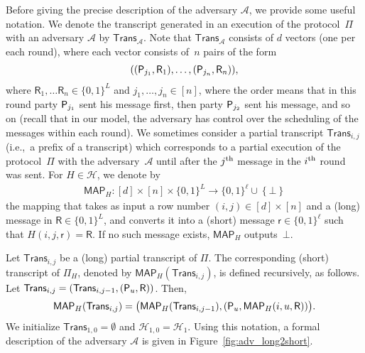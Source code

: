 \documentclass[11pt]{article}
\theoremstyle{plain}
\theoremstyle{definition}
\numberwithin{equation}{section}
\numberwithin{equation}{section} \newcommand{\aka} {also known as\ }
\newcommand{\ie}  {i.e.,\ }
\newcommand{\Hc}{\mathcal H}
\newcommand{\B}{\{ 0,1 \}}
\newcommand{\1}{\mathbf{1}}
\newcommand{\Adv}{\mathcal A}
\newcommand{\ith}[1]{{#1}\textsuperscript{th}}
\newcommand{\lo}{{\mathsf{R}}}
\newcommand{\sh}{{\mathsf{r}}}
\newcommand{\real}{\Adv}
\newcommand{\trans}{{\mathsf{Trans}}}
\newcommand{\MAP}{\mathsf{MAP}}
\theoremstyle{remark}
\begin{document}
Before giving the precise description of the adversary $\Adv$, we provide some
useful notation.  We denote the transcript generated in an execution of the
protocol~$\Pi$ with an adversary $\Adv$ by $\trans_{\real}$. Note that
$\trans_{\real}$ consists of $d$ vectors (one per each round), where each vector
consists of~$n$ pairs of the form
\begin{align*}
  ((\party{j_1},\lo_1),\ldots,(\party{j_{n}},\lo_n)),
\end{align*}
where $\lo_1,\ldots\lo_n\in\B^L$ and $j_1,\dots,j_n\in[n]$, where the order
means that in this round party $\mathsf{P}_{{j_1}}$ sent his message first, then party
$\mathsf{P}_{{j_2}}$ sent his message, and so on (recall that in our model, the adversary has control over the scheduling of the messages within each round). We sometimes consider a partial
transcript $\trans_{i,j}$ (\ie a prefix of a transcript) which corresponds to a
partial execution of the protocol~$\Pi$ with the adversary~$\Adv$ until after the $\ith{j}$ message in the
$\ith{i}$ round was sent. For $H\in\Hc$, we denote by
\begin{align*}
  \MAP_H\colon [d]\times [n]\times\B^L \to \B^\ell \cup \left\{\bot\right\}
\end{align*}
the mapping that takes as input a row number $(i,j)\in[d]\times[n]$ and a (long) message
in $\lo\in \B^L$, and converts it into a (short) message $\sh\in\B^\ell$ such
that $H(i, j, \sh) = \lo$.  If no such message exists, $\MAP_H$ outputs~$\bot$.

Let $\trans_{i,j}$ be a (long) partial transcript of $\Pi$. The corresponding
(short) transcript of $\Pi_H$, denoted by $\MAP_H(\trans_{i,j})$, is defined
recursively, as follows.  Let $\trans_{i,j}=(\trans_{i,j-1}, (\party{u},
\lo))$.  Then,
\begin{align*}
  \MAP_H(\trans_{i,j}) = \big(\MAP_H(\trans_{i,j-1}), (\party{u}, \MAP_H(i, u,
  \lo))\big).
\end{align*}
We initialize $\trans_{1,0}=\emptyset$ and $\Hc_{1,0}=\Hc_1$.  Using this
notation, a formal description of the adversary $\Adv$ is given in
Figure~\ref{fig:adv_long2short}. \\
\end{document}

